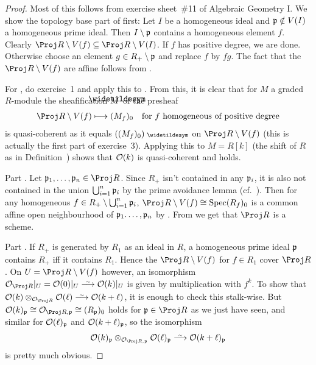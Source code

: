\documentclass[a4paper,parskip=half,numbers=enddot, DIV=12]{scrreprt}
\begin{document}
\begin{proof}
	Most of this follows from exercise sheet~\#11 of Algebraic Geometry I. We show the topology base part of  first: Let $I$ be a homogeneous ideal and $\mathfrak{p}\notin V(I)$ a homogeneous prime ideal. Then $I\setminus \mathfrak{p}$ contains a homogeneous element $f$. Clearly $\Proj R\setminus V(f)\subseteq \Proj R\setminus V(I)$. If $f$ has positive degree, we are done. Otherwise choose an element $g\in R_+\setminus \mathfrak{p}$ and replace $f$ by $fg$. The fact that the $\Proj R\setminus V(f)$ are affine follows from .
	
	For , do exercise~1 and apply this to . From this, it is clear that for $M$ a graded $R$-module the sheafification $\snake{M}$ of the presheaf 
	\begin{align*}
		\Proj R\setminus V(f)\longmapsto (M_f)_0\quad\text{for }f\text{ homogeneous of positive degree}
	\end{align*}
	is quasi-coherent as it equals $((M_f)_0)^\qcmod$ on $\Proj R\setminus V(f)$ (this is actually the first part of exercise~3). Applying this to $M=R[k]$ (the shift of $R$ as in Definition~) shows that $\mathcal{O}(k)$ is quasi-coherent and  holds.
	
	Part . Let $\pp_1,\ldots,\pp_n\in\Proj R$. Since $R_+$ isn't contained in any $\mathfrak{p}_i$, it is also not contained in the union $\bigcup_{i=1}^n\mathfrak{p}_i$ by the prime avoidance lemma (cf.\ \cite[Lemma~2.5.1]{alg1}). Then for any homogeneous $f\in R_+\setminus \bigcup_{i=1}^n\mathfrak{p}_i$, $\Proj R\setminus V(f)\cong \Spec (R_f)_0$ is a common affine open neighbourhood of $\mathfrak{p}_1.\ldots,\mathfrak{p}_n$ by . From \cite[Fact~1.5.9]{alggeo1} we get that $\Proj R$ is a scheme.
	
	Part . If $R_+$ is generated by $R_1$ as an ideal in $R$, a homogeneous prime ideal $\mathfrak{p}$ contains $R_+$ iff it contains $R_1$. Hence the $\Proj R\setminus V(f)$ for $f\in R_1$ cover $\Proj R$. On $U=\Proj R\setminus V(f)$ however, an isomorphism $\Oo_{\Proj R}|_U=\Oo(0)|_U\isomorphism \Oo(k)|_U$ is given by multiplication with $f^k$. To show that $\Oo(k)\otimes_{\Oo_{\Proj R}}\Oo(\ell)\isomorphism\Oo(k+\ell)$, it is enough to check this stalk-wise. But $\Oo(k)_\pp\cong \Oo_{\Proj R,\pp}\cong (R_\pp)_0$ holds for $\pp\in\Proj R$ as we just have seen, and similar for $\mathcal{O}(\ell)_{\mathfrak{p}}$ and $\mathcal{O}(k+\ell)_{\mathfrak{p}}$, so the isomorphism
	\begin{align*}
		\Oo(k)_\pp\otimes_{\Oo_{\Proj R,\pp}}\Oo(\ell)_\pp\isomorphism \Oo(k+\ell)_\pp
	\end{align*}
	is pretty much obvious.
	

\end{proof}
\end{document}
